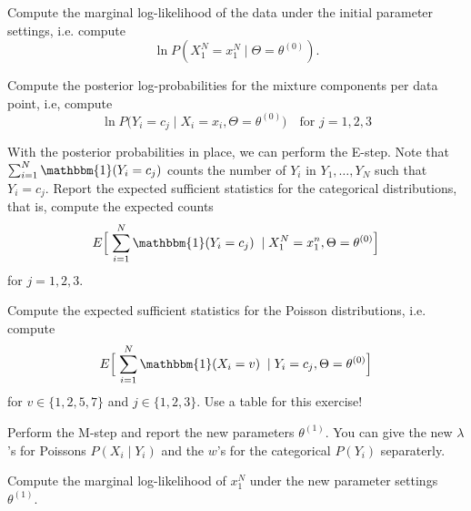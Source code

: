 \documentclass[a4paper,10pt,landscape,twocolumn]{scrartcl}
\newcommand{\Ind}[1]{\mathbbm{1}(#1)}
\begin{document}
\begin{exercise}
	
	
	\begin{subex}
		Compute the marginal log-likelihood of the data under the initial parameter settings, i.e. compute 
		\[
		\ln P(X_1^N = x_1^N \mid \Theta = \theta^{(0)}).
		\]
	\end{subex}
	
	\begin{subex}
		Compute the posterior log-probabilities for the mixture components per data point, i.e, compute
		\[
			\ln P\bigl(Y_i = c_j \mid X_i = x_i, \Theta = \theta^{(0)}\bigr) \quad \text{for $j=1,2,3$}
		\]
	\end{subex}
	
	\begin{subex}
		With the posterior probabilities in place, we can perform the E-step. Note that $\sum_{i=1}^N \Ind{Y_i = c_j}$ counts the number of $Y_i$ in $Y_1, \dots, Y_N$ such that $Y_i = c_j$. Report the expected sufficient statistics for the categorical distributions, that is, compute the expected counts
		\[
			E\Bigl[ \; \sum_{i=1}^N \Ind{Y_i = c_j} \; \mid X_1^N = x_1^n, \Theta = \theta^{(0)} \Bigr]
		\]
		for $j = 1, 2, 3$.
	\end{subex}

	\begin{subex}
	Compute the expected sufficient statistics for the Poisson distributions, i.e. compute 
	\[
		E\Bigl[\;\sum_{i=1}^N \Ind{X_i = v} \;\mid Y_i = c_j,\Theta=\theta^{(0)}\Bigr]
	\] for $ v \in \{1,2,5,7\} $ and $j\in \{1, 2, 3\}$. Use a table for this exercise!
	\end{subex}
	
	\begin{subex}
	Perform the M-step and report the new parameters $\theta^{(1)}$. You can give the new $\lambda$'s for Poissons $P(X_i \mid Y_i)$ and the $w$'s for the categorical $ P(Y_i) $ separaterly.
	\end{subex}
	
	\begin{subex}
		Compute the marginal log-likelihood of $ x_1^N $ under the new parameter settings $\theta^{(1)}$. 
	\end{subex}


\end{exercise}
\end{document}

